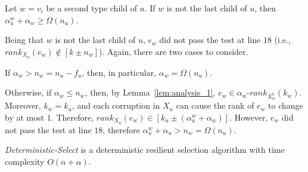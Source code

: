 \documentclass{llncs}
\begin{document}
\begin{lemma}
\label{lem:second_phase_repetitions}
Let $w = v_i$ be a second type child of $u$. If $w$ is not the last child of $u$, then $\alpha_u^w + \alpha_w \geq \Omega(n_u)$.
\end{lemma}

\begin{pf}
Being that $w$ is not the last child of $u$, $e_w$ did not pass the test at line $18$ (i.e., $rank_{X_u}(e_w) \notin [k \pm n_w]$). Again, there are two cases to consider.

If $\alpha_w > n_w = n_u - f_u$, then, in particular, $\alpha_w = \Omega(n_u)$.

Otherwise, if $\alpha_w \leq n_w$, then, by Lemma~\ref{lem:analysis_1}, $e_w \in \alpha_w\text{-}rank_{X_w^0}(k_w)$. Moreover, $k_w = k_u$, and each corruption in $X_u$ can cause the rank of $e_w$ to change by at most $1$. Therefore, $rank_{X_u}(e_w) \in [k_u \pm (\alpha_u^w + \alpha_w)]$. However, $e_w$ did not pass the test at line $18$, therefore $\alpha_u^w + \alpha_u > n_w = \Omega(n_u)$.
\end{pf}






























\begin{theorem}\label{theorem:det_select_alpha}
\emph{Deterministic-Select} is a deterministic resilient selection algorithm with time complexity $O(n + \alpha)$.
\end{theorem}
\end{document}
